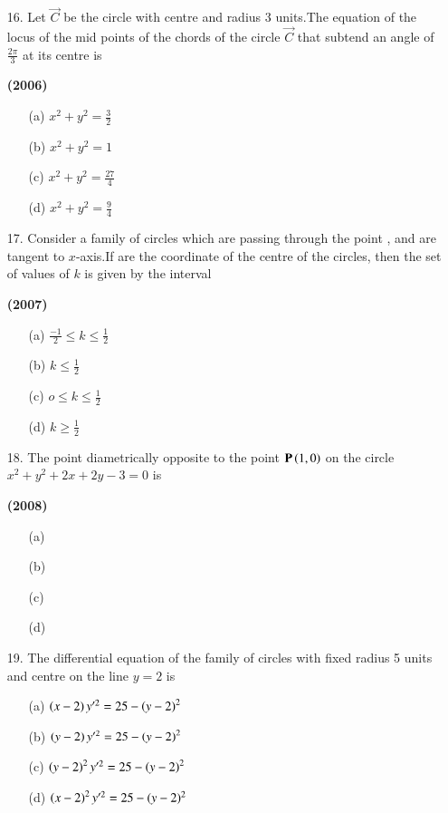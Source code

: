 \documentclass[journal,12pt,twocolumn]{IEEEtran}
\theoremstyle{remark}
\begin{document}
\begin{enumerate}
\item[16.]Let $\vec{C}$ be the circle with centre  and radius 3 units.The equation of the locus of the mid points of the chords of the circle $\vec{C}$ that subtend an angle of $\frac{2\pi}{3}$ at its centre is

\hfill{\textbf{(2006)}}

\begin{enumerate}
\item[(a)] $x^2+y^2=\frac{3}{2}$
\item[(b)] $x^2+y^2=1$
\item[(c)] $x^2+y^2=\frac{27}{4}$
\item[(d)] $x^2+y^2=\frac{9}{4}$
\end{enumerate}
\end{enumerate}
\begin{enumerate}
\item[17.]Consider a family of circles which are passing through the point , and are tangent to $x$-axis.If  are the coordinate of the centre of the circles, then the set of values of $k$ is given by the interval

\hfill{\textbf{(2007)}}

\begin{enumerate}
\item[(a)] $\frac{-1}{2} \le k \le \frac{1}{2}$
\item[(b)] $k \le \frac{1}{2}$
\item[(c)] $o \le k \le \frac{1}{2}$
\item[(d)] $k \ge \frac{1}{2}$
\end{enumerate}
\end{enumerate}
\begin{enumerate}
\item[18.]The point diametrically opposite to the point $\mathbf{P}\left(1,0\right)$ on the circle $x^2+y^2+2x+2y-3=0$ is 

\hfill{\textbf{(2008)}}

\begin{enumerate}
\item[(a)] 
\item[(b)] 
\item[(c)] 
\item[(d)] 
\end{enumerate}
\end{enumerate}
\begin{enumerate}
\item[19.]The differential equation of the family of circles with fixed radius 5 units and centre on the line $y=2$ is


\begin{enumerate}
\item[(a)] $\left(x-2\right)y'^2=25-\left(y-2\right)^2$
\item[(b)] $\left(y-2\right)y'^2=25-\left(y-2\right)^2$
\item[(c)] $\left(y-2\right)^2y'^2=25-\left(y-2\right)^2$
\item[(d)] $\left(x-2\right)^2y'^2=25-(y-2)^2$
\end{enumerate}
\end{enumerate}
\end{document}
